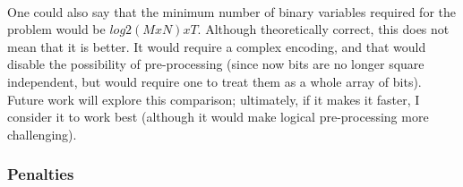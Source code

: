 \documentclass[11pt]{article}
\begin{document}
\\
One could also say that the minimum number of binary variables required for the problem would be \(log2(MxN) x T\). Although theoretically correct, this does not mean that it is better. It would require a complex encoding, and that would disable the possibility of pre-processing (since now bits are no longer square independent, but would require one to treat them as a whole array of bits). Future work will explore this comparison; ultimately, if it makes it faster, I consider it to work best (although it would make logical pre-processing more challenging).

\subsubsection{Penalties}
\end{document}
